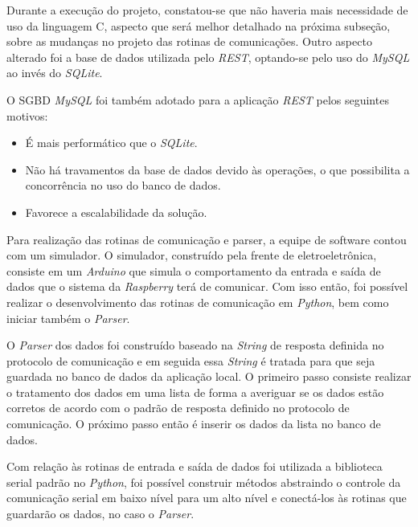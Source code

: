 Durante a execução do projeto, constatou-se que não haveria mais necessidade de uso da linguagem C, aspecto que será melhor detalhado na
próxima subseção, sobre as mudanças no projeto das rotinas de comunicações.
Outro aspecto alterado foi a base de dados utilizada pelo \textit{REST}, optando-se pelo uso do \textit{MySQL} ao invés do \textit{SQLite}.

O SGBD \textit{MySQL} foi também adotado para a aplicação \textit{REST} pelos seguintes motivos:

\begin{itemize}
  \item É mais performático que o \textit{SQLite}.
  \item Não há travamentos da base de dados devido às operações, o que possibilita a concorrência no uso do banco de dados.
  \item Favorece a escalabilidade da solução.
\end{itemize}

 \label{software:rotinas}

Para realização das rotinas de comunicação e parser, a equipe de software contou com um simulador. O simulador, construído pela frente de eletroeletrônica, 
consiste em um \textit{Arduino} que simula o comportamento da entrada e saída de dados que o sistema da \textit{Raspberry} terá de comunicar. Com isso 
então, foi possível realizar o desenvolvimento das rotinas de comunicação em \textit{Python}, bem como iniciar também o \textit{Parser}.

O \textit{Parser} dos dados foi construído baseado na \textit{String} de resposta definida no protocolo de comunicação e em seguida essa \textit{String}
é tratada para que seja guardada no banco de dados da aplicação local.
O primeiro passo consiste realizar o tratamento dos dados em uma lista de forma a averiguar se os dados estão corretos de acordo com o padrão de
resposta definido no protocolo de comunicação. O próximo passo então é inserir os dados da lista no banco de dados.


Com relação às rotinas de entrada e saída de dados foi utilizada a biblioteca serial padrão no \textit{Python},
foi possível construir métodos abstraindo o controle da comunicação serial em baixo
nível para um alto nível e conectá-los às rotinas que guardarão os dados, no caso o \textit{Parser}.

